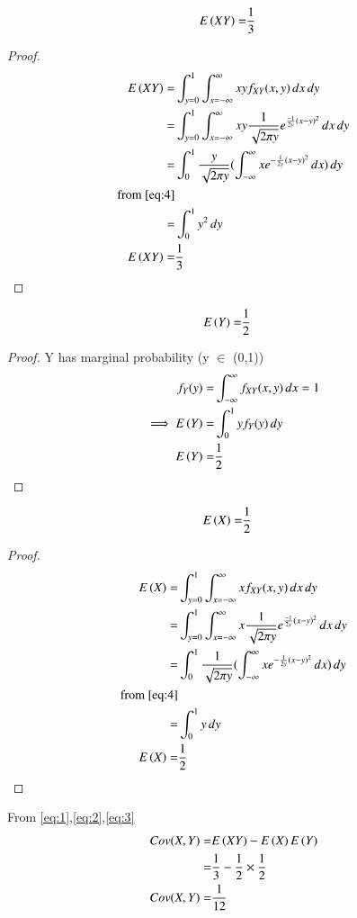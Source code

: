 \documentclass[journal,12pt,twocolumn]{IEEEtran}
\begin{document}
\begin{lemma}
\begin{align}
   E\left(XY\right)=&\frac{1}{3}   
\end{align}
\end{lemma}
\begin{proof}
\begin{align}
    E\left(XY\right)=&\int_{y=0}^{1}\int_{x=-\infty}^{\infty}xy f_{XY}(x,y)\,dx\,dy\\
    =&\int_{y=0}^{1}\int_{x=-\infty}^{\infty}xy\frac{1}{\sqrt{2\pi y}}e^{\frac{-1}{2y}(x-y)^2}\,dx \,dy\\
    =&\int_{0}^{1}\frac{y}{\sqrt{2\pi y}}(\int_{-\infty}^{\infty}xe^{-\frac{1}{2y}(x-y)^2}\,dx)\,dy\\
    \text{from \eqref{eq:4}}\\
    =&\int_{0}^{1}y^2 \,dy\\
     E\left(XY\right)=&\frac{1}{3} \label{eq:1}
    \end{align}
\end{proof} 

\begin{lemma}
\begin{align}
     E\left(Y\right)=&\frac{1}{2}
\end{align}
\end{lemma}
\begin{proof}
Y has marginal probability (y $\in$ (0,1))
\begin{align}
    f_Y(y)=&\int_{-\infty}^{\infty}f_{XY}(x,y)\,dx =1\\
    \implies E\left(Y\right)=&\int_{0}^{1} y f_{Y}(y)\,dy\\
    E\left(Y\right)=&\frac{1}{2} \label{eq:2}
\end{align}
\end{proof}

\begin{lemma}
\begin{align}
  E\left(X\right)=&\frac{1}{2}   
\end{align}
\end{lemma}
\begin{proof}
\begin{align}
 E\left(X\right)=&\int_{y=0}^{1}\int_{x=-\infty}^{\infty}x f_{XY}(x,y)\,dx\,dy\\
    =&\int_{y=0}^{1}\int_{x=-\infty}^{\infty}x\frac{1}{\sqrt{2\pi y}}e^{\frac{-1}{2y}(x-y)^2}\,dx \,dy\\
     =&\int_{0}^{1}\frac{1}{\sqrt{2\pi y}}(\int_{-\infty}^{\infty}xe^{-\frac{1}{2y}(x-y)^2}\,dx)\,dy\\
     \text{from \eqref{eq:4}}\\
    =&\int_{0}^{1}y\,dy\\
E\left(X\right)=&\frac{1}{2} \label{eq:3}
\end{align}
\end{proof}
From \eqref{eq:1},\eqref{eq:2},\eqref{eq:3}
\begin{align}
Cov(X,Y)=&E\left(XY\right)-E\left(X\right)E\left(Y\right)\\
       =&\frac{1}{3}-\frac{1}{2}\times \frac{1}{2}\\
Cov(X,Y)=&\frac{1}{12}
\end{align}
\end{document}
